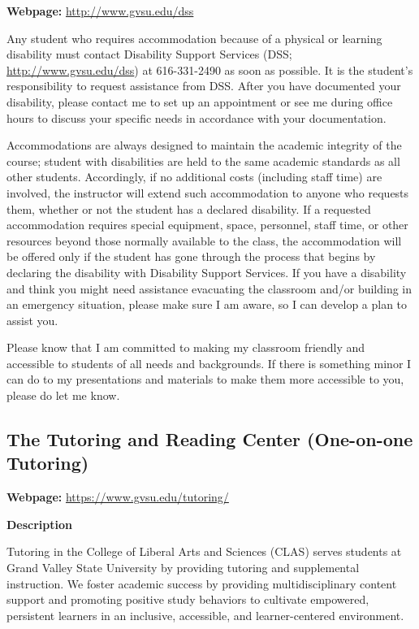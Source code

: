 \documentclass[
  12pt,
  letterpaper,
]{scrartcl}
\begin{document}
\textbf{Webpage:} \url{http://www.gvsu.edu/dss}

Any student who requires accommodation because of a physical or learning
disability must contact Disability Support Services (DSS;
\url{http://www.gvsu.edu/dss}) at 616-331-2490 as soon as possible. It
is the student's responsibility to request assistance from DSS. After
you have documented your disability, please contact me to set up an
appointment or see me during office hours to discuss your specific needs
in accordance with your documentation.

Accommodations are always designed to maintain the academic integrity of
the course; student with disabilities are held to the same academic
standards as all other students. Accordingly, if no additional costs
(including staff time) are involved, the instructor will extend such
accommodation to anyone who requests them, whether or not the student
has a declared disability. If a requested accommodation requires special
equipment, space, personnel, staff time, or other resources beyond those
normally available to the class, the accommodation will be offered only
if the student has gone through the process that begins by declaring the
disability with Disability Support Services. If you have a disability
and think you might need assistance evacuating the classroom and/or
building in an emergency situation, please make sure I am aware, so I
can develop a plan to assist you.

Please know that I am committed to making my classroom friendly and
accessible to students of all needs and backgrounds. If there is
something minor I can do to my presentations and materials to make them
more accessible to you, please do let me know.

\subsection{The Tutoring and Reading Center (One-on-one
Tutoring)}\label{the-tutoring-and-reading-center-one-on-one-tutoring}

\textbf{Webpage:} \url{https://www.gvsu.edu/tutoring/}

\textbf{Description}

Tutoring in the College of Liberal Arts and Sciences (CLAS) serves
students at Grand Valley State University by providing tutoring and
supplemental instruction. We foster academic success by providing
multidisciplinary content support and promoting positive study behaviors
to cultivate empowered, persistent learners in an inclusive, accessible,
and learner-centered environment.
\end{document}
